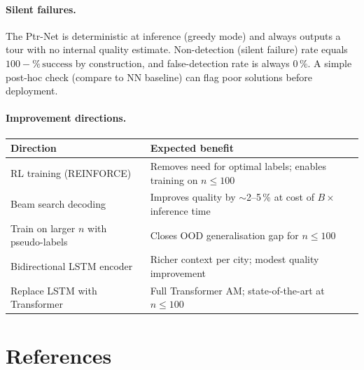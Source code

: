 \documentclass[12pt,a4paper]{article}
\begin{document}
\paragraph{Silent failures.}
The Ptr-Net is deterministic at inference (greedy mode) and always outputs a
tour with no internal quality estimate.
Non-detection (silent failure) rate equals $100 - \%\,\mathrm{success}$ by
construction, and false-detection rate is always $0\,\%$.
A simple post-hoc check (compare to NN baseline) can flag poor solutions
before deployment.

\paragraph{Improvement directions.}

\begin{center}
\begin{tabularx}{\linewidth}{lX}
\toprule
\textbf{Direction} & \textbf{Expected benefit} \\
\midrule
RL training (REINFORCE) & Removes need for optimal labels; enables training
  on $n \leq 100$ \\
Beam search decoding & Improves quality by $\sim$2--5\,\% at cost of $B\times$
  inference time \\
Train on larger $n$ with pseudo-labels & Closes OOD generalisation gap for
  $n \leq 100$ \\
Bidirectional LSTM encoder & Richer context per city; modest quality
  improvement \\
Replace LSTM with Transformer & Full Transformer AM; state-of-the-art at
  $n \leq 100$ \\
\bottomrule
\end{tabularx}
\end{center}

\section*{References}
\end{document}
